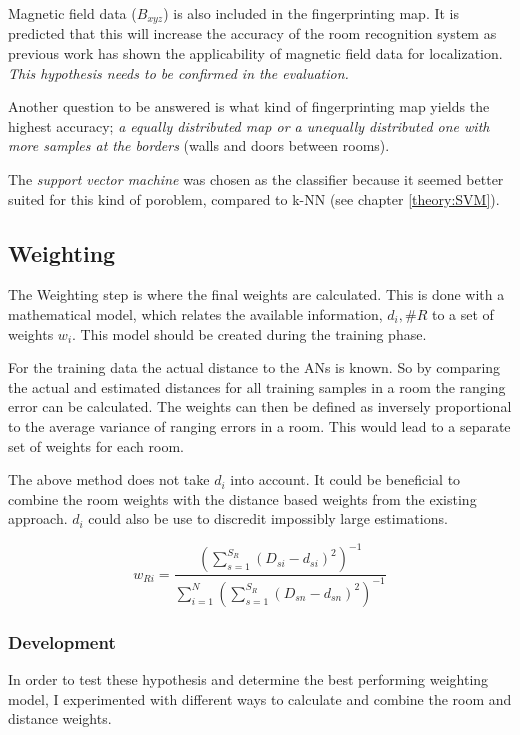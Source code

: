 Magnetic field data ($B_{xyz}$) is also included in the fingerprinting map. It is predicted that this will increase the accuracy of the room recognition system as previous work has shown the applicability of  magnetic field data for localization. \emph{This hypothesis needs to be confirmed in the evaluation.}

Another question to be answered is what kind of fingerprinting map yields the highest accuracy; \emph{a equally distributed map or a unequally distributed one with more samples at the borders }(walls and doors between rooms).

The \emph{support vector machine} was chosen as the classifier because it seemed better suited for this kind of poroblem, compared to k-NN (see chapter \ref{theory:SVM}).

\subsection{Weighting}

The Weighting step is where the final weights are calculated. This is done with a mathematical model, which relates the available information, \(d_i,\#R\) to a set of weights \(w_i\). This model should be created during the training phase.

For the training data the actual distance to the ANs is known. So by comparing the actual and estimated distances for all training samples in a room the ranging error can be calculated. The weights can then be defined as inversely proportional to the average variance of ranging errors in a room. This would lead to a separate set of weights for each room.

The above method does not take \(d_i\) into account. It could be beneficial to combine the room weights with the distance based weights from the existing approach. \(d_i\) could also be use to discredit impossibly large estimations.

\begin{equation}
w_{Ri}=\frac{(\sum_{s=1}^{S_R}{(D_{si}-d_{si})^2})^{-1}}{\sum_{i=1}^{N}{(\sum_{s=1}^{S_R}{(D_{sn}-d_{sn})^2})^{-1}}}
\end{equation}


\subsubsection{Development}
\label{WeightingModelDefinition}

In order to test these hypothesis and determine the best performing weighting model, I experimented with different ways to calculate and combine the room and distance weights.

